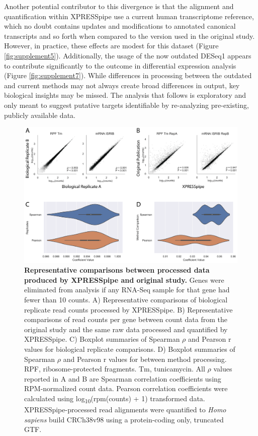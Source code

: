 \documentclass[10pt, oneside]{article}
\begin{document}
Another potential contributor to this divergence is that the alignment and quantification within XPRESSpipe use a current human transcriptome reference, which no doubt contains updates and modifications to annotated canonical transcripts and so forth when compared to the version used in the original study. However, in practice, these effects are modest for this dataset (Figure \ref{fig:supplement5}). Additionally, the usage of the now outdated DESeq1 \cite{deseq1} appears to contribute significantly to the outcome in differential expression analysis (Figure \ref{fig:supplement7}). While differences in processing between the outdated and current methods may not always create broad differences in output, key biological insights may be missed. The analysis that follows is exploratory and only meant to suggest putative targets identifiable by re-analyzing pre-existing, publicly available data.\par

\begin{figure}
\centering
  \includegraphics[width=145mm]{figures/xpresspipe_figure2.png}
  \caption{\textbf{Representative comparisons between processed data produced by XPRESSpipe and original study.} Genes were eliminated from analysis if any RNA-Seq sample for that gene had fewer than 10 counts. A) Representative comparisons of biological replicate read counts processed by XPRESSpipe. B) Representative comparisons of read counts per gene between count data from the original study and the same raw data processed and quantified by XPRESSpipe. C) Boxplot summaries of Spearman $\rho$ and Pearson r values for biological replicate comparisons. D) Boxplot summaries of Spearman $\rho$ and Pearson r values for between method processing. RPF, ribosome-protected fragments. Tm, tunicamycin. All $\rho$ values reported in A and B are Spearman correlation coefficients using RPM-normalized count data. Pearson correlation coefficients were calculated using log\textsubscript{10}(rpm(counts) + 1) transformed data. XPRESSpipe-processed read alignments were quantified to \textit{Homo sapiens} build CRCh38v98 using a protein-coding only, truncated GTF.}
  \label{fig:figure2}
\end{figure}
\end{document}
